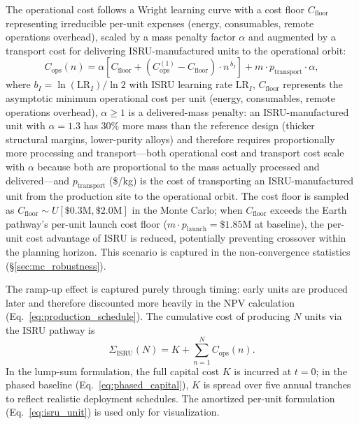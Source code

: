 \documentclass[preprint,12pt]{elsarticle}
\begin{document}
The operational cost follows a Wright learning curve with a cost floor $C_{\mathrm{floor}}$ representing irreducible per-unit expenses (energy, consumables, remote operations overhead), scaled by a mass penalty factor $\alpha$ and augmented by a transport cost for delivering ISRU-manufactured units to the operational orbit:
\begin{equation}
  C_{\mathrm{ops}}(n) = \alpha \left[ C_{\mathrm{floor}} + \left(C_{\mathrm{ops}}^{(1)} - C_{\mathrm{floor}}\right) \cdot n^{\,b_I} \right] + m \cdot p_{\mathrm{transport}} \cdot \alpha,
  \label{eq:isru_ops}
\end{equation}
where $b_I = \ln(\mathrm{LR}_I)/\ln 2$ with ISRU learning rate $\mathrm{LR}_I$, $C_{\mathrm{floor}}$ represents the asymptotic minimum operational cost per unit (energy, consumables, remote operations overhead), $\alpha \geq 1$ is a delivered-mass penalty: an ISRU-manufactured unit with $\alpha = 1.3$ has 30\% more mass than the reference design (thicker structural margins, lower-purity alloys) and therefore requires proportionally more processing and transport---both operational cost and transport cost scale with $\alpha$ because both are proportional to the mass actually processed and delivered---and $p_{\mathrm{transport}}$ (\$/kg) is the cost of transporting an ISRU-manufactured unit from the production site to the operational orbit. The cost floor is sampled as $C_{\mathrm{floor}} \sim U[\$0.3\text{M}, \$2.0\text{M}]$ in the Monte Carlo; when $C_{\mathrm{floor}}$ exceeds the Earth pathway's per-unit launch cost floor ($m \cdot p_{\mathrm{launch}} = \$1.85$M at baseline), the per-unit cost advantage of ISRU is reduced, potentially preventing crossover within the planning horizon. This scenario is captured in the non-convergence statistics (\S\ref{sec:mc_robustness}).

The ramp-up effect is captured purely through timing: early units are produced later and therefore discounted more heavily in the NPV calculation (Eq.~\ref{eq:production_schedule}). The cumulative cost of producing $N$ units via the ISRU pathway is
\begin{equation}
  \Sigma_{\mathrm{ISRU}}(N) = K + \sum_{n=1}^{N} C_{\mathrm{ops}}(n).
  \label{eq:isru_cum}
\end{equation}
In the lump-sum formulation, the full capital cost $K$ is incurred at $t=0$; in the phased baseline (Eq.~\ref{eq:phased_capital}), $K$ is spread over five annual tranches to reflect realistic deployment schedules. The amortized per-unit formulation (Eq.~\ref{eq:isru_unit}) is used only for visualization.
\end{document}
